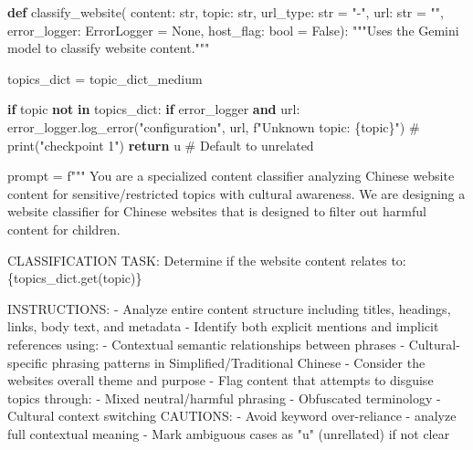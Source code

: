 \documentclass[
  titlepage]{article}
\newenvironment{Shaded}{\begin{snugshade}}{\end{snugshade}}
\newcommand{\BuiltInTok}[1]{\textcolor[rgb]{0.00,0.23,0.31}{#1}}
\newcommand{\CommentTok}[1]{\textcolor[rgb]{0.37,0.37,0.37}{#1}}
\newcommand{\ControlFlowTok}[1]{\textcolor[rgb]{0.00,0.23,0.31}{\textbf{#1}}}
\newcommand{\KeywordTok}[1]{\textcolor[rgb]{0.00,0.23,0.31}{\textbf{#1}}}
\newcommand{\NormalTok}[1]{\textcolor[rgb]{0.00,0.23,0.31}{#1}}
\newcommand{\OperatorTok}[1]{\textcolor[rgb]{0.37,0.37,0.37}{#1}}
\newcommand{\SpecialCharTok}[1]{\textcolor[rgb]{0.37,0.37,0.37}{#1}}
\newcommand{\SpecialStringTok}[1]{\textcolor[rgb]{0.13,0.47,0.30}{#1}}
\newcommand{\StringTok}[1]{\textcolor[rgb]{0.13,0.47,0.30}{#1}}
\newcommand{\VariableTok}[1]{\textcolor[rgb]{0.07,0.07,0.07}{#1}}
\begin{document}
\begin{Shaded}
\begin{Highlighting}[]
\KeywordTok{def}\NormalTok{ classify\_website(}
\NormalTok{    content: }\BuiltInTok{str}\NormalTok{, }
\NormalTok{    topic: }\BuiltInTok{str}\NormalTok{, }
\NormalTok{    url\_type: }\BuiltInTok{str} \OperatorTok{=} \StringTok{"{-}"}\NormalTok{, }
\NormalTok{    url: }\BuiltInTok{str} \OperatorTok{=} \StringTok{""}\NormalTok{, }
\NormalTok{    error\_logger: ErrorLogger }\OperatorTok{=} \VariableTok{None}\NormalTok{, }
\NormalTok{    host\_flag: }\BuiltInTok{bool} \OperatorTok{=} \VariableTok{False}\NormalTok{):}
    \CommentTok{"""Uses the Gemini model to classify website content."""}

\NormalTok{    topics\_dict }\OperatorTok{=}\NormalTok{ topic\_dict\_medium}

    \ControlFlowTok{if}\NormalTok{ topic }\KeywordTok{not} \KeywordTok{in}\NormalTok{ topics\_dict:}
        \ControlFlowTok{if}\NormalTok{ error\_logger }\KeywordTok{and}\NormalTok{ url:}
\NormalTok{            error\_logger.log\_error(}\StringTok{"configuration"}\NormalTok{, url, }\SpecialStringTok{f"Unknown topic: }\SpecialCharTok{\{}\NormalTok{topic}\SpecialCharTok{\}}\SpecialStringTok{"}\NormalTok{)}
        \CommentTok{\# print("checkpoint 1")}
        \ControlFlowTok{return} \StringTok{\textquotesingle{}u\textquotesingle{}}  \CommentTok{\# Default to \textquotesingle{}unrelated\textquotesingle{}}

\NormalTok{    prompt }\OperatorTok{=} \SpecialStringTok{f"""}
\SpecialStringTok{    You are a specialized content classifier analyzing Chinese website content for sensitive/restricted topics with cultural awareness.}
\SpecialStringTok{    We are designing a website classifier for Chinese websites that is designed to filter out harmful content for children.}

\SpecialStringTok{    CLASSIFICATION TASK:}
\SpecialStringTok{    Determine if the website content relates to: }\SpecialCharTok{\{}\NormalTok{topics\_dict}\SpecialCharTok{.}\NormalTok{get(topic)}\SpecialCharTok{\}}

\SpecialStringTok{    INSTRUCTIONS:}
\SpecialStringTok{    {-} Analyze entire content structure including titles, headings, links, body text, and metadata}
\SpecialStringTok{    {-} Identify both explicit mentions and implicit references using:}
\SpecialStringTok{        {-} Contextual semantic relationships between phrases}
\SpecialStringTok{        {-} Cultural{-}specific phrasing patterns in Simplified/Traditional Chinese}
\SpecialStringTok{    {-} Consider the website\textquotesingle{}s overall theme and purpose}
\SpecialStringTok{    {-} Flag content that attempts to disguise topics through:}
\SpecialStringTok{        {-} Mixed neutral/harmful phrasing}
\SpecialStringTok{        {-} Obfuscated terminology}
\SpecialStringTok{        {-} Cultural context switching}
\SpecialStringTok{    }
\SpecialStringTok{    CAUTIONS:}
\SpecialStringTok{    {-} Avoid keyword over{-}reliance {-} analyze full contextual meaning}
\SpecialStringTok{    {-} Mark ambiguous cases as "u" (unrellated) if not clear}


\end{Highlighting}
\end{Shaded}
\end{document}
